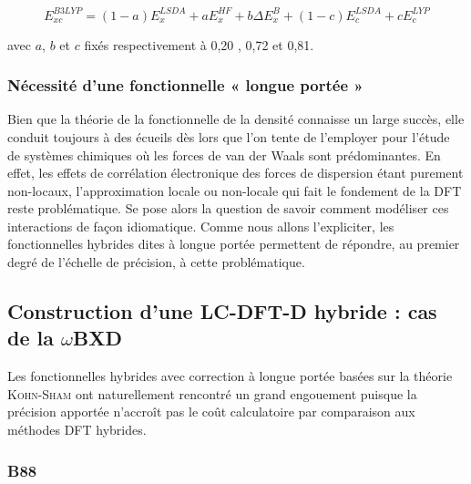 \documentclass[12pt,a4paper]{book}
\begin{document}
	\begin{equation}
	E_{xc}^{B3LYP} = (1-a) E_{x}^{LSDA} + a E_{x}^{HF} + b \Delta E_{x}^{B} + (1-c) E_{c}^{LSDA} + c E_{c}^{LYP}
	\label{B3LYP}
	\end{equation}
	
	\noindent avec $a$, $b$ et $c$ fixés respectivement à 0,20 , 0,72 et 0,81.
	
	
	\subsubsection{Nécessité d'une fonctionnelle « longue portée »}
	
	Bien que la théorie de la fonctionnelle de la densité connaisse un large succès, elle conduit toujours à des écueils dès lors que l'on tente de l'employer pour l'étude de systèmes chimiques où les forces de van der Waals sont prédominantes. 
	En effet, les effets de corrélation électronique des forces de dispersion étant purement non-locaux, l'approximation locale ou non-locale qui fait le fondement de la DFT reste problématique. Se pose alors la question de savoir comment modéliser ces interactions de façon idiomatique.
	 Comme nous allons l'expliciter, les fonctionnelles hybrides dites \og à longue portée \fg{} permettent de répondre, au premier degré de l'échelle de précision, à cette problématique. 
	
	
	\subsection[LC-DFT-D hybride : $\omega$BXD]{Construction d'une LC-DFT-D hybride : cas de la $\omega$BXD}
	Les fonctionnelles hybrides avec correction à longue portée basées sur la théorie \textsc{Kohn-Sham} ont naturellement rencontré un grand engouement puisque la précision apportée n'accroît pas le coût calculatoire par comparaison aux méthodes DFT hybrides.
	
	\subsubsection{B88}
	
\end{document}
